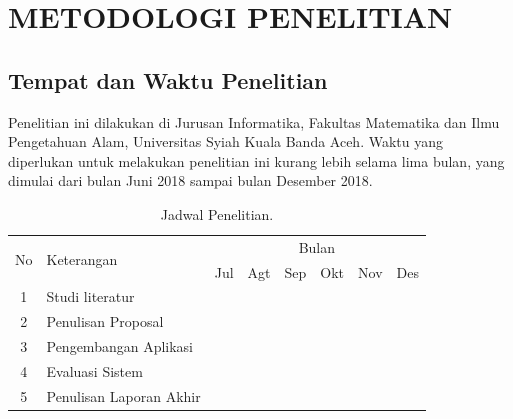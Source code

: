 
\chapter{METODOLOGI PENELITIAN}

\section{Tempat dan Waktu Penelitian}
\setlength\parindent{30pt} Penelitian ini dilakukan di Jurusan Informatika, Fakultas Matematika dan Ilmu Pengetahuan Alam, Universitas Syiah Kuala Banda Aceh. Waktu yang diperlukan untuk melakukan penelitian ini kurang lebih selama lima bulan, yang dimulai dari bulan Juni 2018 sampai bulan Desember 2018.

\begin{table}[H]
	\center
	\caption{Jadwal Penelitian.}
	\label{jadwal}
	\begin{tabular}{|c|l|l|l|l|l|l|l|}
		\hline
		\multirow{2}{*}{No} & \multirow{2}{*}{Keterangan} 	& \multicolumn{6}{c|}{Bulan}           																										\\ \cline{3-8} 
							&                           	& Jul				& Agt  			& Sep			& Okt			& Nov			& Des 					\\ \hline       
		1                   & Studi literatur           	&\cellcolor{gray}	&\cellcolor{gray}	&                   &                   &                   &                       	\\ \hline
		2                   & Penulisan Proposal           	&                   &\cellcolor{gray}	&\cellcolor{gray}	&                   &                   &                        	\\ \hline
		3                   & Pengembangan Aplikasi         &                   &                   & \cellcolor{gray}  & \cellcolor{gray} 	& \cellcolor{gray}  &                            \\ \hline
		4                   & Evaluasi Sistem               &                   &                   &           		&             		&\cellcolor{gray}	&  \cellcolor{gray}    \\ \hline
		5                   & Penulisan Laporan Akhir       &                   &                   &                   &        			&      				& \cellcolor{gray}     \\ \hline
	\end{tabular}
\end{table}

